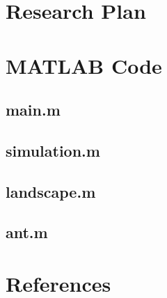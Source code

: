 \documentclass[11pt]{article}
\begin{document}
\section{Research Plan}

\section{MATLAB Code}
\subsection{main.m}

\subsection{simulation.m}

\subsection{landscape.m}

\subsection{ant.m}


\section{References}



\end{document}
